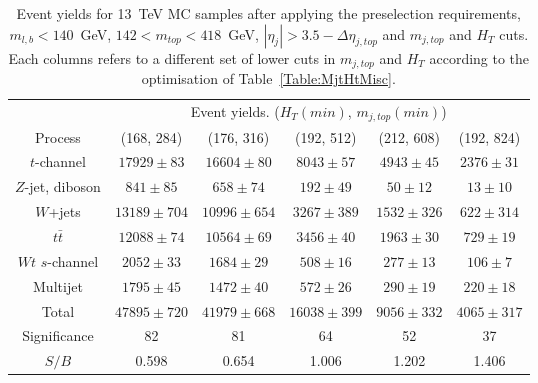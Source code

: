 \begin{table} [htb]
\begin{center}
\begin{tabular}{|c|c|c|c|c|c|} 
\hline
& \multicolumn{5}{|c|}{Event yields. ($H_T (min)$, $m_{j,top}(min)$)} \\ \cline{2-6}
Process & (168, 284) & (176, 316) & (192, 512) & (212, 608) & (192, 824) \\ \hline
$t$-channel & $17929 \pm 83$ & $16604 \pm 80$ & $8043 \pm 57$ & $4943 \pm 45$&$2376\pm 31$ \\
$Z$-jet, diboson & $841 \pm 85$  & $658\pm 74$ & $192\pm 49$  & $50\pm 12$ &$13 \pm 10$ \\
$W$+jets & $13189 \pm 704$ & $10996\pm 654$ & $3267 \pm 389$ &$1532\pm 326$&$622\pm 314$\\
$t\bar{t}$ & $12088\pm 74$ & $10564\pm 69$ & $3456\pm 40$ &$1963\pm 30$ & $729\pm 19$\\
$Wt$ $s$-channel & $2052 \pm 33$ & $1684\pm 29$ & $508 \pm 16$ & $277 \pm 13$ & $106 \pm 7$ \\
Multijet & $1795 \pm 45$ & $1472\pm 40$ & $572\pm 26$ & $290\pm 19$ & $220\pm 18$\\ \hline 
Total & $47895 \pm 720$ & $41979\pm 668$ & $16038\pm 399$ &$9056\pm 332$& $4065\pm 317$\\ \hline \hline
Significance & 82 & 81 & 64 & 52 & 37 \\ \hline
$S/B$ & 0.598 & 0.654 & 1.006 & 1.202 & 1.406 \\ \hline


\end{tabular}
\caption{Event yields for 13~TeV MC samples after applying the preselection requirements, $m_{l,b} < 140$~GeV, $142 < m_{top} < 418$~GeV, $|\eta_j| > 3.5-\Delta\eta_{j,top}$ and $m_{j,top}$ and $H_{T}$ cuts. Each columns refers to a different set of lower cuts in $m_{j,top}$ and $H_{T}$ according to the optimisation of Table~\ref{Table:MjtHtMisc}.} 
\label{Table:FINAL}
\end{center}
\end{table}

\clearpage

